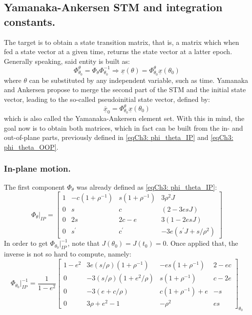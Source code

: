 	\subsection{Yamanaka-Ankersen STM and integration constants.}
	\indent The target is to obtain a state transition matrix, that is, a matrix which when fed a state vector at a given time, returns the state vector at a latter epoch. Generally speaking, said entity is built as:
	\[
	\Phi_{\theta_0}^{\theta} = \Phi_{\theta} \Phi_{\theta_0}^{-1}	\Rightarrow \underline{x} \left(\theta\right) = \Phi_{\theta_0}^\theta \underline{x} \left(\theta_0 \right) 
	\]
	\noindent where $\theta$ can be substituted by any independent variable, such as time. Yamanaka and Ankersen propose to merge the second part of the STM and the initial state vector, leading to the so-called pseudoinitial state vector, defined by:
	\[
	\underline{\overline{x}}_0 =  \Phi_{\theta_0}^\theta \underline{x} \left(\theta_0 \right) 
	\]	
	\noindent which is also called the Yamanaka-Ankersen element set. With this in mind, the goal now is to obtain both matrices, which in fact can be built from the in- and out-of-plane parts, previously defined in \eqref{eqCh3: phi_theta_IP} and \eqref{eqCh3: phi_theta_OOP}.
	\clearpage
		\subsubsection{In-plane motion.}
		\indent The first component $\Phi_{\theta}$ was already defined as \eqref{eqCh3: phi_theta_IP}:
		\begin{equation}
		\Phi_{\theta}\rvert_{IP} = \left[ 
		\begin{array}{cccc}
		1 &  -c(1 + \rho^{-1}) & s(1 + \rho^{-1}) & 3 \rho^2 J \\
		0 & s & c & (2 - 3 e s J) \\
		0 & 2s & 2c - e & 3(1  - 2 e s J)\\
		0 & s^{\prime} & c^{\prime} & -3 e(s^{\prime} J + s / \rho^2 )
		\end{array}
		\right]
		\label{eqCh3: phi_IP}
		\end{equation}
		\indent In order to get $\Phi_{\theta_0}\rvert_{IP}^{-1}$, note that $J(\theta_0) = J(t_0) = 0$. Once applied that, the inverse is not so hard to compute, namely:
		\begin{equation}
		\Phi_{\theta_0}\rvert_{IP}^{-1} = 
		\dfrac{1}{1 - e^2}		
		\left[ 
		\begin{array}{cccc}
		1 - e^2 	& 3e(s/\rho) \left(1 + \rho^{-1}\right) 	& -es\left(1 + \rho^{-1}\right) 	& 2 - ec 	\\
		0 			& -3(s/\rho) \left(1 + e^2/\rho\right) 	& s\left(1 + \rho^{-1}\right) 		& c - 2e 	\\
		0		 	& -3 		\left(e + c/\rho\right) 	& c\left(1 + \rho^{-1}\right) + e 	& -s 		\\
		0		 	& 3\rho + e^2 - 1 						& -\rho^2 						& es 
		\end{array}
		\right]_{\theta_0}
		\label{eqCh3: phi_inv_IP}
		\end{equation}
